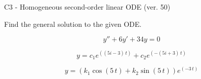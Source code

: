 \begin{exercise}
  \begin{exerciseTitle}C3 - Homogeneous second-order linear ODE (ver. 50)\end{exerciseTitle}
  \begin{exerciseStatement}
    
Find the general solution to the given ODE.

    
\[y''+6y'+34y = 0\]

  \end{exerciseStatement}
  \begin{exerciseAnswer}
    
\[y= c_{1} e^{\left(\left(5 i - 3\right) \, t\right)} + c_{2} e^{\left(-\left(5 i + 3\right) \, t\right)}\]

    
\[y= {\left(k_{1} \cos\left(5 \, t\right) + k_{2} \sin\left(5 \, t\right)\right)} e^{\left(-3 \, t\right)}\]

  \end{exerciseAnswer}
\end{exercise}